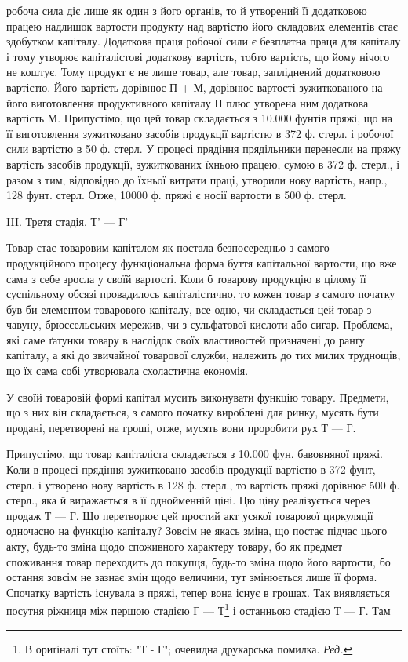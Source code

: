 \parcont{}  %
робоча сила діє лише як один з його органів, то й утворений її додатковою
працею надлишок вартости продукту над вартістю його складових
елементів стає здобутком капіталу. Додаткова праця робочої сили є
безплатна праця для капіталу і тому утворює капіталістові додаткову
вартість, тобто вартість, що йому нічого не коштує. Тому продукт є не
лише товар, але товар, запліднений додатковою вартістю. Його вартість
дорівнює П + М, дорівнює вартості зужиткованого на його виготовлення
продуктивного капіталу П плюс утворена ним додаткова вартість М.
Припустімо, що цей товар складається з 10.000 фунтів пряжі, що на її
виготовлення зужитковано засобів продукції вартістю в 372 ф. стерл. і
робочої сили вартістю в 50 ф. стерл. У процесі прядіння прядільники
перенесли на пряжу вартість засобів продукції, зужиткованих їхньою
працею, сумою в 372 ф. стерл., і разом з тим, відповідно до їхньої
витрати праці, утворили нову вартість, напр., 128 фунт. стерл. Отже,
10000 ф. пряжі є носії вартости в 500 ф. стерл.

III. Третя стадія. Т' — Г'

Товар стає товаровим капіталом як постала безпосередньо з самого
продукційного процесу функціональна форма буття капітальної вартости,
що вже сама з себе зросла у своїй вартості. Коли б товарову продукцію
в цілому її суспільному обсязі провадилось капіталістично, то кожен
товар з самого початку був би елементом товарового капіталу, все одно,
чи складається цей товар з чавуну, брюссельських мережив, чи з сульфатової
кислоти або сигар. Проблема, які саме ґатунки товару в наслідок своїх
властивостей призначені до ранґу капіталу, а які до звичайної товарової
служби, належить до тих милих труднощів, що їх сама собі утворювала
схоластична економія.

У своїй товаровій формі капітал мусить виконувати функцію товару.
Предмети, що з них він складається, з самого початку вироблені для
ринку, мусять бути продані, перетворені на гроші, отже, мусять вони
проробити рух Т — Г.

Припустімо, що товар капіталіста складається з 10.000 фун. бавовняної
пряжі. Коли в процесі прядіння зужитковано засобів продукції вартістю
в 372 фунт, стерл. і утворено нову вартість в 128 ф. стерл., то вартість
пряжі дорівнює 500 ф. стерл., яка й виражається в її однойменній ціні.
Цю ціну реалізується через продаж Т — Г. Що перетворює цей простий
акт усякої товарової циркуляції одночасно на функцію капіталу? Зовсім
не якась зміна, що постає підчас цього акту, будь-то зміна щодо споживного
характеру товару, бо як предмет споживання товар переходить до покупця,
будь-то зміна щодо його вартости, бо остання зовсім не зазнає змін
щодо величини, тут змінюється лише її форма. Спочатку вартість існувала
в пряжі, тепер вона існує в грошах. Так виявляється посутня
ріжниця між першою стадією Г — Т\footnote*{
В ориґіналі тут стоїть: "Т - Г"; очевидна друкарська помилка. \emph{Ред.}
} і останньою стадією Т — Г. Там
\parbreak{}  %
